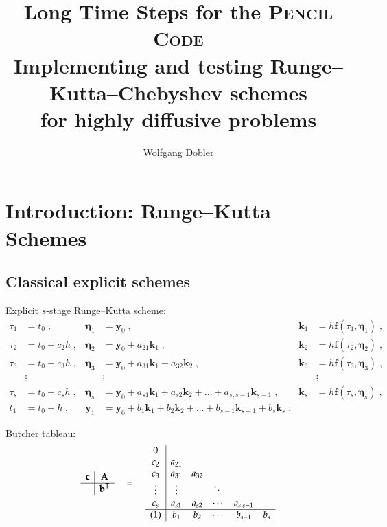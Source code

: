 \documentclass[\mydriver,12pt,twoside,notitlepage]{article}
\title{Long Time Steps for the \textsc{Pencil Code}\\[1.5ex]
  {\large Implementing and testing Runge--Kutta--Chebyshev schemes\\
    for highly diffusive problems}
}
\author{Wolfgang Dobler}
\newcommand{\Av}      {\mathbf{A}}
\newcommand{\bv}      {\mathbf{b}}
\newcommand{\cv}      {\mathbf{c}}
\newcommand{\etav}    {\bm{\eta}}
\newcommand{\fv}      {\mathbf{f}}
\newcommand{\kv}      {\mathbf{k}}
\newcommand{\yv}{\mathbf{y}}
\begin{document}
\maketitle

\clearpage
\tableofcontents
\clearpage

\section{Introduction: Runge--Kutta Schemes}

\subsection{Classical explicit schemes}
Explicit $s$-stage Runge--Kutta scheme:
\begin{align}
  \tau_1 &= t_0 \; ,
            & \etav_1 &= \yv_0 \; ,
                         & \kv_1 &= h\fv(\tau_1, \etav_1) \; ,\\
  \tau_2 &= t_0 + c_2 h \; ,
            & \etav_2 &= \yv_0 + a_{21} \kv_1 \; ,
                         & \kv_2 &= h\fv(\tau_2, \etav_2) \; ,\\
  \tau_3 &= t_0 + c_3 h \; ,
            & \etav_3 &= \yv_0 + a_{31} \kv_1 + a_{32} \kv_2 \; ,
                         & \kv_3 &= h\fv(\tau_3, \etav_3) \; ,\\
  & \vdots &  & \vdots  &  &\vdots \nonumber \\
  \tau_s &= t_0 + c_s h \; ,
            & \etav_s &= \yv_0 + a_{s1} \kv_1 + a_{s2} \kv_2
             + \ldots + a_{s,s-1} \kv_{s-1} \; ,
                              & \kv_s &= h\fv(\tau_s, \etav_s) \; ,\\
  t_1 &= t_0 + h \; ,
            & \yv_1   &= \yv_0 + b_1 \kv_1 + b_2 \kv_2
                         + \ldots + b_{s-1} \kv_{s-1} + b_{s} \kv_{s} \; .
\end{align}


Butcher tableau:
\begin{equation}
  \begin{array}{c|c}
    \cv & \Av \\
    \hline
        & \bv^{\mathsf T}
  \end{array}
  \quad=\quad
  \begin{array}{c|ccccc}
    0                                                 \\
    c_2    & a_{21}                                   \\
    c_3    & a_{31} & a_{32}                          \\
    \vdots & \vdots &        & \ddots &               \\
    c_s    & a_{s1} & a_{s2} & \cdots & a_{s,s-1}     \\
    \hline
    (1)    & b_1    & b_2    & \cdots & b_{s-1} & b_s
  \end{array}
\end{equation}
\end{document}
